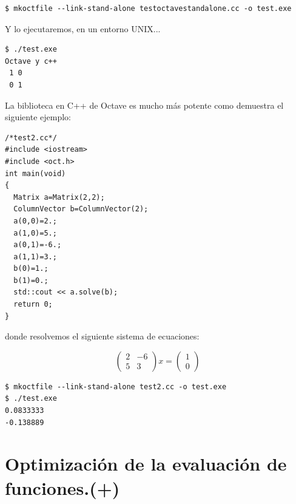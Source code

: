 \begin{verbatim}
$ mkoctfile --link-stand-alone testoctavestandalone.cc -o test.exe
\end{verbatim}
Y lo ejecutaremos, en un entorno UNIX...

\begin{verbatim}
$ ./test.exe
Octave y c++
 1 0
 0 1
\end{verbatim}

La biblioteca en C++ de Octave es mucho más potente como demuestra el
siguiente ejemplo:

\begin{verbatim}
/*test2.cc*/
#include <iostream>
#include <oct.h>
int main(void)
{
  Matrix a=Matrix(2,2);
  ColumnVector b=ColumnVector(2);
  a(0,0)=2.;
  a(1,0)=5.;
  a(0,1)=-6.;
  a(1,1)=3.;
  b(0)=1.;
  b(1)=0.;
  std::cout << a.solve(b);
  return 0;
}
\end{verbatim}
donde resolvemos el siguiente sistema de ecuaciones:

$$
\left(\begin{array}{cc}
    2 & -6\\
    5 & 3\end{array}\right)x= \left(\begin{array}{c}
    1\\
    0\end{array}\right)$$


\begin{verbatim}
$ mkoctfile --link-stand-alone test2.cc -o test.exe
$ ./test.exe 
0.0833333 
-0.138889 
\end{verbatim}



\section{Optimización de la evaluación de funciones.(+)}

